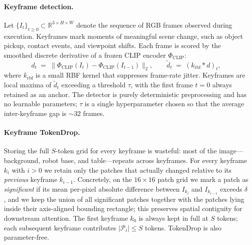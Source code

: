 \documentclass{article}
\begin{document}
\paragraph{Keyframe detection.}
Let $\{I_t\}_{t \geq 0}\!\subset\!\mathbb{R}^{3\times H\times W}$ denote the sequence of RGB frames observed during execution.
Keyframes mark moments of meaningful scene change, such as object pickup, contact events, and viewpoint shifts. Each frame is scored by the smoothed
discrete derivative of a frozen CLIP encoder $\Phi_{\mathrm{CLIP}}$:
\begin{equation}
  d_t \;=\; \big\| \Phi_{\mathrm{CLIP}}(I_t) - \Phi_{\mathrm{CLIP}}(I_{t-1}) \big\|_2,
  \qquad
  \tilde d_t \;=\; (k_{\mathrm{rbf}} * d)_t,
\end{equation}
where $k_{\mathrm{rbf}}$ is a small RBF kernel that suppresses frame-rate
jitter. Keyframes are local maxima of $\tilde d_t$ exceeding a threshold
$\tau$, with the first frame $t=0$ always retained as an anchor. The
detector is purely deterministic preprocessing and has no learnable
parameters; $\tau$ is a single hyperparameter chosen so that the average
inter-keyframe gap is $\sim\!32$ frames.

\paragraph{Keyframe TokenDrop.}
Storing the full $S$-token grid for every keyframe is wasteful: most of
the image---background, robot base, and table---repeats across keyframes. For
every keyframe $k_i$ with $i\!>\!0$ we retain only the patches that
actually changed relative to its \emph{previous} keyframe $k_{i-1}$.
Concretely, on the $16\!\times\!16$ patch grid we mark a patch as
\emph{significant} if its mean per-pixel absolute difference between
$I_{k_i}$ and $I_{k_{i-1}}$ exceeds $\delta$, and we keep the union of
all significant patches together with the patches lying inside their
axis-aligned bounding rectangle; this preserves spatial contiguity
for downstream attention. The first keyframe $k_0$ is always kept in
full at $S$ tokens; each subsequent keyframe contributes
$|\mathcal{P}_i|\!\le\!S$ tokens. TokenDrop is also parameter-free.
\end{document}
